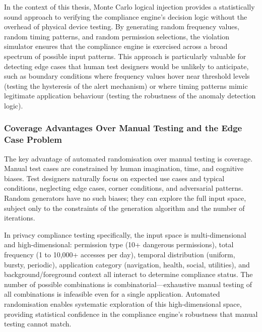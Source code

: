 In the context of this thesis, Monte Carlo logical injection provides a statistically sound approach to verifying the compliance engine's decision logic without the overhead of physical device testing. By generating random frequency values, random timing patterns, and random permission selections, the violation simulator ensures that the compliance engine is exercised across a broad spectrum of possible input patterns. This approach is particularly valuable for detecting edge cases that human test designers would be unlikely to anticipate, such as boundary conditions where frequency values hover near threshold levels (testing the hysteresis of the alert mechanism) or where timing patterns mimic legitimate application behaviour (testing the robustness of the anomaly detection logic).

\subsubsection{Coverage Advantages Over Manual Testing and the Edge Case Problem}
The key advantage of automated randomisation over manual testing is coverage. Manual test cases are constrained by human imagination, time, and cognitive biases. Test designers naturally focus on expected use cases and typical conditions, neglecting edge cases, corner conditions, and adversarial patterns. Random generators have no such biases; they can explore the full input space, subject only to the constraints of the generation algorithm and the number of iterations.

In privacy compliance testing specifically, the input space is multi-dimensional and high-dimensional: permission type (10+ dangerous permissions), total frequency (1 to 10,000+ accesses per day), temporal distribution (uniform, bursty, periodic), application category (navigation, health, social, utilities), and background/foreground context all interact to determine compliance status. The number of possible combinations is combinatorial—exhaustive manual testing of all combinations is infeasible even for a single application. Automated randomisation enables systematic exploration of this high-dimensional space, providing statistical confidence in the compliance engine's robustness that manual testing cannot match.

